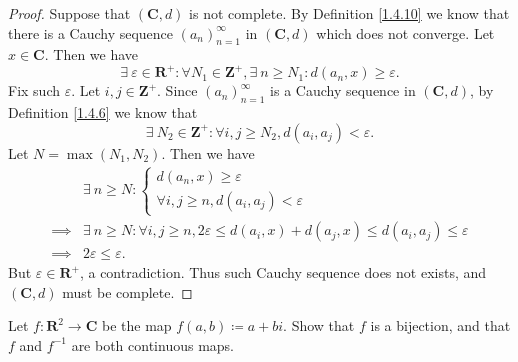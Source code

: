 \begin{proof}
    Suppose that \((\mathbf{C}, d)\) is not complete.
    By Definition \ref{1.4.10} we know that there is a Cauchy sequence \((a_n)_{n = 1}^\infty\) in \((\mathbf{C}, d)\) which does not converge.
    Let \(x \in \mathbf{C}\).
    Then we have
    \[
        \exists\ \varepsilon \in \mathbf{R}^+ : \forall N_1 \in \mathbf{Z}^+, \exists\ n \geq N_1 : d(a_n, x) \geq \varepsilon.
    \]
    Fix such \(\varepsilon\).
    Let \(i, j \in \mathbf{Z}^+\).
    Since \((a_n)_{n = 1}^\infty\) is a Cauchy sequence in \((\mathbf{C}, d)\), by Definition \ref{1.4.6} we know that
    \[
        \exists\ N_2 \in \mathbf{Z}^+ : \forall i, j \geq N_2, d(a_i, a_j) < \varepsilon.
    \]
    Let \(N = \max(N_1, N_2)\).
    Then we have
    \begin{align*}
                 & \exists\ n \geq N : \begin{cases}
                                           d(a_n, x) \geq \varepsilon \\
                                           \forall i, j \geq n, d(a_i, a_j) < \varepsilon
                                       \end{cases}                                                  \\
        \implies & \exists\ n \geq N : \forall i, j \geq n, 2\varepsilon \leq d(a_i, x) + d(a_j, x) \leq d(a_i, a_j) \leq \varepsilon \\
        \implies & 2\varepsilon \leq \varepsilon.
    \end{align*}
    But \(\varepsilon \in \mathbf{R}^+\), a contradiction.
    Thus such Cauchy sequence does not exists, and \((\mathbf{C}, d)\) must be complete.
\end{proof}

\begin{exercise}\label{ex 4.6.11}
    Let \(f : \mathbf{R}^2 \to \mathbf{C}\) be the map \(f(a, b) \coloneqq a + bi\).
    Show that \(f\) is a bijection, and that \(f\) and \(f^{-1}\) are both continuous maps.
\end{exercise}

